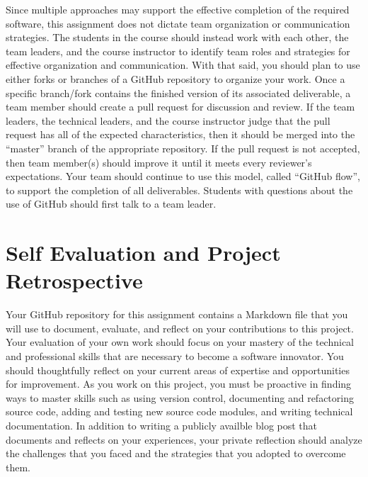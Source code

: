 \documentclass[11pt]{article}
\begin{document}
Since multiple approaches may support the effective completion of the required
software, this assignment does not dictate team organization or communication
strategies. The students in the course should instead work with each other, the
team leaders, and the course instructor to identify team roles and strategies
for effective organization and communication. With that said, you should plan to
use either forks or branches of a GitHub repository to organize your work.
%
Once a specific branch/fork contains the finished version of its associated
deliverable, a team member should create a pull request for discussion and
review. If the team leaders, the technical leaders, and the course instructor
judge that the pull request has all of the expected characteristics, then it
should be merged into the ``master'' branch of the appropriate repository. If
the pull request is not accepted, then team member(s) should improve it until it
meets every reviewer's expectations. Your team should continue to use this
model, called ``GitHub flow'', to support the completion of all deliverables.
%
Students with questions about the use of GitHub should first talk to a team
leader.

\section*{Self Evaluation and Project Retrospective}


Your GitHub repository for this assignment contains a Markdown file that you
will use to document, evaluate, and reflect on your contributions to this
project.
%
Your evaluation of your own work should focus on your mastery of the technical
and professional skills that are necessary to become a software innovator. You
should thoughtfully reflect on your current areas of expertise and opportunities
for improvement. As you work on this project, you must be proactive in finding
ways to master skills such as using version control, documenting and refactoring
source code, adding and testing new source code modules, and writing technical
documentation. In addition to writing a publicly availble blog post that
documents and reflects on your experiences, your private reflection should
analyze the challenges that you faced and the strategies that you adopted to
overcome them.

\end{document}

